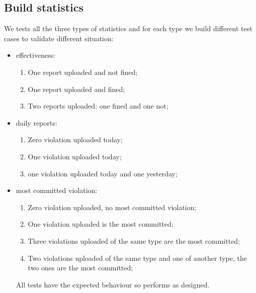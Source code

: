 \documentclass[../ITD.tex]{subfiles}
\begin{document}
    \subsection{Build statistics}\label{subsec:build-statistics}
    We tests all the three types of statistics and for each type we build different test cases to validate different situation:
    \begin{itemize}
        \item effectiveness:
        \begin{enumerate}
            \item One report uploaded and not fined;
            \item One report uploaded and fined;
            \item Two reports uploaded: one fined and one not;
        \end{enumerate}
        \item daily reports:
        \begin{enumerate}
            \item Zero violation uploaded today;
            \item One violation uploaded today;
            \item one violation uploaded today and one yesterday;
        \end{enumerate}
        \item most committed violation:
        \begin{enumerate}
            \item Zero violation uploaded, no most committed violation;
            \item One violation uploaded is the most committed;
            \item Three violations uploaded of the same type are the most committed;
            \item Two violations uploaded of the same type and one of another type, the two ones are the most committed;
        \end{enumerate}
        All tests have the expected behaviour so performs as designed.
    \end{itemize}
\end{document}
